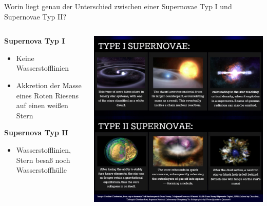 \begin{frame}{Worin liegt genau der Unterschied zwischen einer Supernovae Typ I und Supernovae Typ II?}
\begin{columns}
  \begin{column}{0.5\textwidth}
    \textbf{Supernova Typ I}
    \begin{itemize}
      \item Keine Wasserstofflinien
      \item Akkretion der Masse eines Roten Riesens auf einen weißen Stern
      \end{itemize}
      \vspace{1em}
      \textbf{Supernova Typ II}
      \begin{itemize}
        \item Wasserstofflinien, Stern besaß noch Wasserstoffhülle
      \end{itemize}
  \end{column}
  \begin{column}{0.5\textwidth}
      \includegraphics[width=\textwidth]{images/supernova.png}
    \end{column}
\end{columns}
\end{frame}


